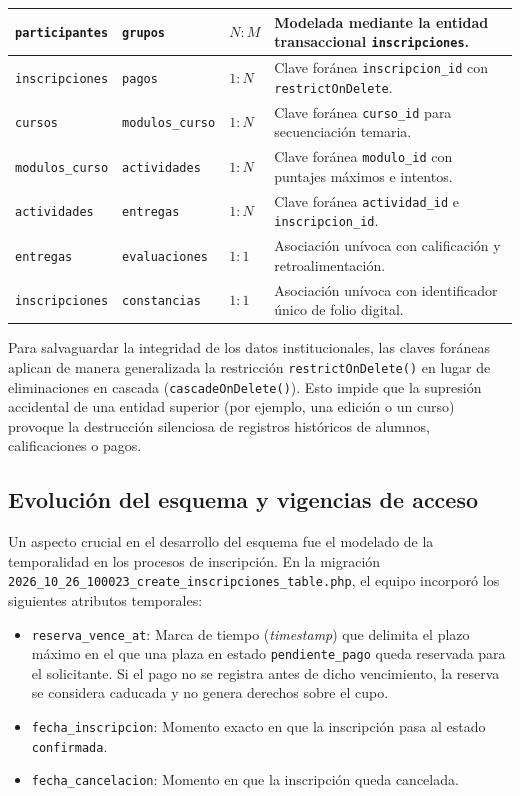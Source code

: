 \begin{table}[htbp]
\begin{tabularx}{\textwidth}{|p{3.2cm}|p{3.0cm}|p{2.2cm}|X|}
\hline
\texttt{participantes} & \texttt{grupos} & $N:M$ & Modelada mediante la entidad transaccional \texttt{inscripciones}. \\
\hline
\texttt{inscripciones} & \texttt{pagos} & $1:N$ & Clave foránea \texttt{inscripcion\_id} con \texttt{restrictOnDelete}. \\
\hline
\texttt{cursos} & \texttt{modulos\_curso} & $1:N$ & Clave foránea \texttt{curso\_id} para secuenciación temaria. \\
\hline
\texttt{modulos\_curso} & \texttt{actividades} & $1:N$ & Clave foránea \texttt{modulo\_id} con puntajes máximos e intentos. \\
\hline
\texttt{actividades} & \texttt{entregas} & $1:N$ & Clave foránea \texttt{actividad\_id} e \texttt{inscripcion\_id}. \\
\hline
\texttt{entregas} & \texttt{evaluaciones} & $1:1$ & Asociación unívoca con calificación y retroalimentación. \\
\hline
\texttt{inscripciones} & \texttt{constancias} & $1:1$ & Asociación unívoca con identificador único de folio digital. \\
\hline
\end{tabularx}
\end{table}

Para salvaguardar la integridad de los datos institucionales, las claves foráneas aplican de manera generalizada la restricción \texttt{restrictOnDelete()} en lugar de eliminaciones en cascada (\texttt{cascadeOnDelete()}). Esto impide que la supresión accidental de una entidad superior (por ejemplo, una edición o un curso) provoque la destrucción silenciosa de registros históricos de alumnos, calificaciones o pagos.

\subsection{Evolución del esquema y vigencias de acceso}
\label{sec:evolucion_esquema}

Un aspecto crucial en el desarrollo del esquema fue el modelado de la temporalidad en los procesos de inscripción. En la migración \texttt{2026\_10\_26\_100023\_create\_inscripciones\_table.php}, el equipo incorporó los siguientes atributos temporales:
\begin{itemize}
    \item \texttt{reserva\_vence\_at}: Marca de tiempo (\textit{timestamp}) que delimita el plazo máximo en el que una plaza en estado \texttt{pendiente\_pago} queda reservada para el solicitante. Si el pago no se registra antes de dicho vencimiento, la reserva se considera caducada y no genera derechos sobre el cupo.
    \item \texttt{fecha\_inscripcion}: Momento exacto en que la inscripción pasa al estado \texttt{confirmada}.
    \item \texttt{fecha\_cancelacion}: Momento en que la inscripción queda cancelada.
\end{itemize}

